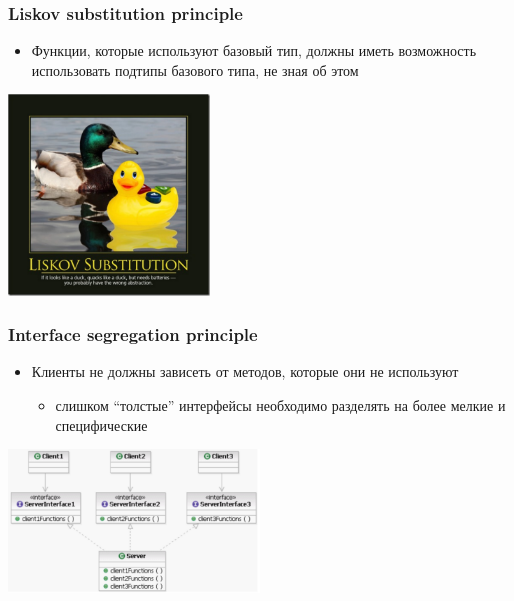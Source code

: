 \documentclass[xetex,mathserif,serif]{beamer}
\begin{document}
    \begin{frame}
        \frametitle{Liskov substitution principle}
        \begin{itemize}
            \item Функции, которые используют базовый тип, должны иметь возможность использовать подтипы базового типа, не зная об этом
        \end{itemize}
        \begin{flushright}
            \includegraphics[width=0.4\textwidth]{liskovSubstitutionPrinciple.png}
        \end{flushright}
    \end{frame}

    \begin{frame}
        \frametitle{Interface segregation principle}
        \begin{itemize}
            \item Клиенты не должны зависеть от методов, которые они не используют
            \begin{itemize}
                \item слишком ``толстые'' интерфейсы необходимо разделять на более мелкие и специфические
            \end{itemize}
        \end{itemize}
        \begin{flushright}
            \includegraphics[width=0.5\textwidth]{interfaceSegregationPrinciple.png}
        \end{flushright}
    \end{frame}
\end{document}
